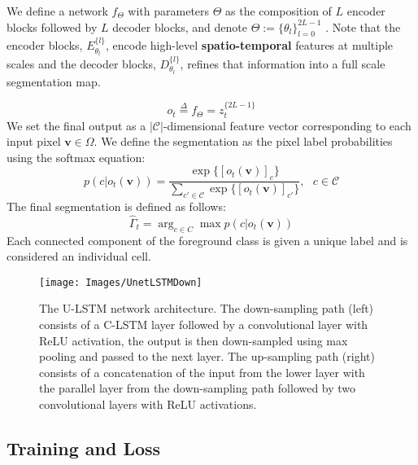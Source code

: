 \documentclass{article}
\begin{document}
We define a network  $f_{\Theta}$ with parameters $\Theta$ as  the composition of $L$ encoder blocks followed by $L$ decoder blocks, and denote $\Theta := \{\theta_l\}_{l=0}^{2L-1}$ . Note that the encoder blocks, $E_{\theta_l}^{\{l\}}$,  encode high-level \textbf{spatio-temporal} features at multiple scales and the decoder blocks, $D_{\theta_l}^{\{l\}}$, refines that information into a full scale segmentation map.

\begin{equation}
o_t \overset{\Delta}{=} f_{\Theta}= z_t^{\{2L-1\}}
\end{equation}
We set the final output as a $|\mathcal{C}|$-dimensional feature vector corresponding to each input pixel $\mathbf{v}\in \Omega$. 
We define the segmentation as the pixel label probabilities using the softmax equation: \begin{equation}
p(c|o_t(\mathbf{v}))=\frac{\exp\{[o_t(\mathbf{v})]_c\}}{\sum_{c'\in\mathcal{C}}\exp\{[o_t(\mathbf{v})]_{c'}\}}, ~~~ c\in\mathcal{C}\label{softmax}
\end{equation}
The final segmentation is defined as follows:
\begin{equation}
\hat{\Gamma}_t = \arg_{c\in C} \max p(c|o_t(\mathbf{v}))
\end{equation}
Each connected component of the foreground class is given a unique label and is considered an individual cell. 
\begin{figure}
\noindent \begin{centering}
\texttt{[image: Images/UnetLSTMDown]}  \par\end{centering}
\protect\caption{The U-LSTM network architecture. The down-sampling path (left) consists of a C-LSTM layer followed by a convolutional layer with ReLU activation, the output is then down-sampled using max pooling and passed to the next layer. The up-sampling path (right) consists of a concatenation of the input from the lower layer with the parallel layer from the down-sampling path followed by two convolutional layers with ReLU activations.  \label{fig:Architecture}}
\end{figure}

\subsection{Training and Loss}\label{subsec:Training}
\end{document}
